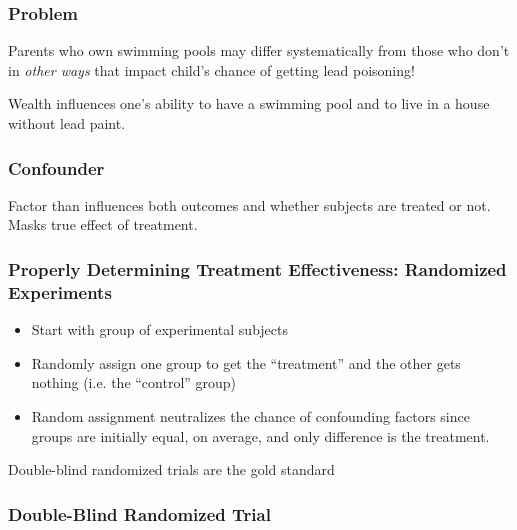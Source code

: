 \documentclass{beamer}
\begin{document}
\begin{frame}
\frametitle{Problem}
	Parents who own swimming pools may differ systematically from those who don't in 				\emph{other ways} that impact child's chance of getting lead poisoning!
	\vspace{2em}
	\begin{alertblock}{Wealth influences one's ability to have a swimming pool and to live in a house without lead paint.}
	\end{alertblock}
\end{frame}

\begin{frame}
\frametitle{Confounder}
	Factor than influences both outcomes and whether subjects are treated or not. Masks true 			effect of treatment.
\end{frame}

\begin{frame}
\frametitle{Properly Determining Treatment Effectiveness: Randomized Experiments}
	\begin{itemize}
		\item Start with group of experimental subjects
		\item Randomly assign one group to get the ``treatment'' and the other gets nothing (i.e. the ``control'' group)
		\item Random assignment neutralizes the chance of confounding factors since groups are 			initially equal, on average, and only difference is the treatment.
	\end{itemize}
	\alert{Double-blind randomized trials are the gold standard}
\end{frame}

\begin{frame}
\frametitle{Double-Blind Randomized Trial}
\begin{figure}
\centering
{}
\end{figure}
\end{frame}
\end{document}
